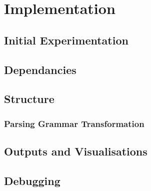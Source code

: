 \chapter{Implementation} \label{implementation}


\section{Initial Experimentation}



\section{Dependancies} \label{dependancies}
\section{Structure} \label{structure}
\subsection{Parsing Grammar Transformation} \label{parsing_grammar_transformation}
\section{Outputs and Visualisations} \label{outputs_and_visualisations}
\section{Debugging} \label{debugging}
